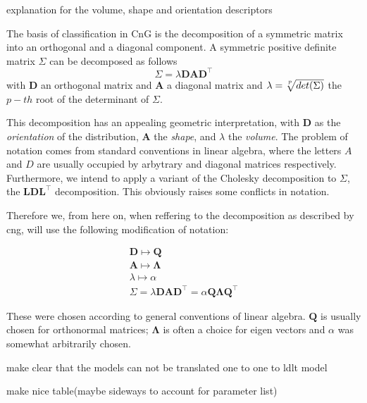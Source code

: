 explanation for the volume, shape and orientation descriptors

The basis of classification in CnG is the decomposition of a symmetric matrix into
an orthogonal and a diagonal component.
A symmetric positive definite matrix $ \Sigma $ can be decomposed as follows
\[ \Sigma = \lambda \pmb{D} \pmb{A} \pmb{D}^{\top} \]
with $ \pmb{D} $ an orthogonal matrix and $ \pmb{A} $ a diagonal matrix and 
$ \lambda = \sqrt[\uproot{3}p]{det(\Sigma)} $ the $ p-th $ root of the determinant 
of $ \Sigma $.

This decomposition has an appealing geometric interpretation, with $ \pmb{D} $ 
as the \textit{orientation} of the distribution, $ \pmb{A} $ the \textit{shape}, and $ \lambda $
the \textit{volume}.
The problem of notation comes from standard conventions in linear algebra, where
the letters $A$ and $D$ are usually occupied by arbytrary and diagonal matrices 
respectively. Furthermore, we intend to apply a variant of the Cholesky decomposition
to $ \Sigma $, the $ \pmb{L}\pmb{D}\pmb{L}^{\top} $ decomposition.
This obviously raises some conflicts in notation.

Therefore we, from here on, when reffering to the decomposition as described
by cng, will use the following modification of notation:

\begin{align*} 
	\pmb{D} \longmapsto \pmb{Q} \\
	\pmb{A} \longmapsto \pmb{\Lambda} \\
	\lambda \longmapsto \alpha  \\
	\Sigma = \lambda \pmb{D} \pmb{A} \pmb{D}^{\top} =
		\alpha \pmb{Q} \pmb{\Lambda} \pmb{Q}^{\top}
\end{align*}

These were chosen according to general conventions of linear algebra.
$ \pmb{Q} $ is usually chosen for orthonormal matrices; $ \pmb{\Lambda} $ is 
often a choice for eigen vectors and $ \alpha $ was somewhat arbitrarily chosen.


make clear that the models can not be translated one to one to ldlt model

make nice table(maybe sideways to account for parameter list)


